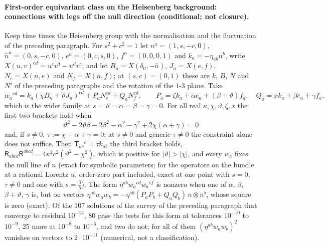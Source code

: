 \paragraph{First-order equivariant class on the Heisenberg background: connections with legs off the null direction (conditional; not closure).}
Keep time times the Heisenberg group with the normalisation and the fluctuation of the preceding paragraph. For \(s^2+c^2=1\) let \(n^a=(1,s,-c,0)\), \(\hat n^a=(0,s,-c,0)\), \(e^a=(0,c,s,0)\), \(f^a=(0,0,0,1)\) and \(k_a=-\eta_{ab}n^b\), write \(X(u,v)^{cd}=u^cv^d-u^dv^c\), and let \(B_n=X(\delta_0,-\hat n)\), \(J_n=X(e,f)\), \(N_e=X(n,e)\) and \(N_f=X(n,f)\); at \((s,c)=(0,1)\) these are \(k\), \(B\), \(N\) and \(N'\) of the preceding paragraphs and the rotation of the \(1\)-\(3\) plane. Take
\[
w_a{}^{cd}=k_a(\chi B_n+\vartheta J_n)^{cd}+P_aN_e^{cd}+Q_aN_f^{cd},\qquad P_a=\zeta k_a+\alpha e_a+(\beta+\vartheta)f_a,\quad Q_a=xk_a+\beta e_a+\gamma f_a,
\]
which is the wider family at \(s=\vartheta=\alpha=\beta=\gamma=0\). For all real \(\kappa,\chi,\vartheta,\zeta,x\) the first two brackets hold when
\[
\vartheta^2-2\vartheta\beta-2\beta^2-\alpha^2-\gamma^2+2\chi(\alpha+\gamma)=0
\]
and, if \(s\neq0\), \(\tau:=\chi+\alpha+\gamma=0\); at \(s\neq0\) and generic \(\tau\neq0\) the constraint alone does not suffice. Then \(\mathsf T_{ac}{}^c=\tau k_a\), the third bracket holds, \(\mathsf R_{abcd}\mathsf R^{abcd}=4\kappa^2c^2(\vartheta^2-\chi^2)\), which is positive for \(|\vartheta|>|\chi|\), and every \(w_a\) fixes the null line of \(n\) (exact for symbolic parameters; for the operators on the bundle at a rational Lorentz \(u\), order-zero part included, exact at one point with \(s=0\), \(\tau\neq0\) and one with \(s=\tfrac35\)). The form \(\eta^{ab}w_a{}^{cd}w_b{}^{ef}\) is nonzero when one of \(\alpha\), \(\beta\), \(\beta+\vartheta\), \(\gamma\) is, but on vectors \(\eta^{ab}w_aw_b=-\eta^{ab}(P_aP_b+Q_aQ_b)\,n\otimes n^\flat\), whose square is zero (exact). Of the 107 solutions of the survey of the preceding paragraph that converge to residual \(10^{-13}\), 80 pass the tests for this form at tolerances \(10^{-10}\) to \(10^{-9}\), 25 more at \(10^{-8}\) to \(10^{-6}\), and two do not; for all of them \((\eta^{ab}w_aw_b)^2\) vanishes on vectors to \(2\cdot10^{-11}\) (numerical, not a classification).

